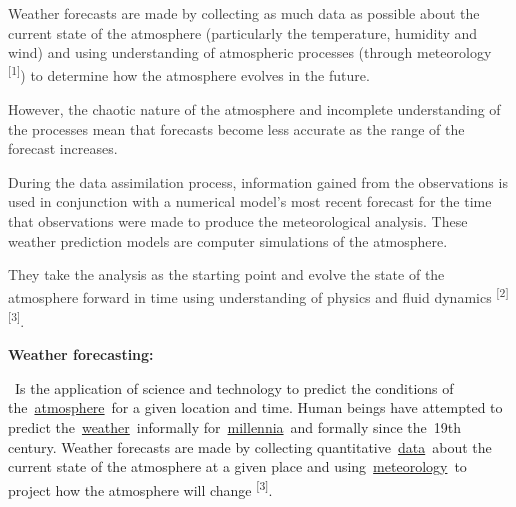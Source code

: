\documentclass[12pt]{article}
\begin{document}
{\fontsize{13pt}{15.6pt}\selectfont \textcolor[HTML]{333333}{Weather forecasts are made by collecting as much data as possible about the current state of the atmosphere (particularly the temperature, humidity and wind) and using understanding of atmospheric processes (through meteorology \textsuperscript{[1]}) to determine how the atmosphere evolves in the future.}\par}\par

\setlength{\parskip}{7.44pt}
{\fontsize{13pt}{15.6pt}\selectfont \textcolor[HTML]{333333}{However, the chaotic nature of the atmosphere and incomplete understanding of the processes mean that forecasts become less accurate as the range of the forecast increases.}\par}\par

{\fontsize{13pt}{15.6pt}\selectfont \textcolor[HTML]{333333}{During the data assimilation process, information gained from the observations is used in conjunction with a numerical model's most recent forecast for the time that observations were made to produce the meteorological analysis. These weather prediction models are computer simulations of the atmosphere.}\par}\par

{\fontsize{13pt}{15.6pt}\selectfont \textcolor[HTML]{333333}{They take the analysis as the starting point and evolve the state of the atmosphere forward in time using understanding of physics and fluid dynamics \textsuperscript{[2][3]}.}\par}\par


\vspace{\baselineskip}

\vspace{\baselineskip}
{\fontsize{13pt}{15.6pt}\selectfont \textbf{\textcolor[HTML]{222222}{Weather forecasting:}}\par}\par

{\fontsize{13pt}{15.6pt}\selectfont  Is the application of science and technology to predict the conditions of the \href{https://en.wikipedia.org/wiki/Earth$\%$ 27s\_atmosphere}{atmosphere} for a given location and time. Human beings have attempted to predict the \href{https://en.wikipedia.org/wiki/Weather}{weather} informally for \href{https://en.wikipedia.org/wiki/Millennia}{millennia} and formally since the 19th century. Weather forecasts are made by collecting quantitative \href{https://en.wikipedia.org/wiki/Data}{data} about the current state of the atmosphere at a given place and using \href{https://en.wikipedia.org/wiki/Meteorology}{meteorology} to project how the atmosphere will change \textsuperscript{[3]}.\par}\par
\end{document}
